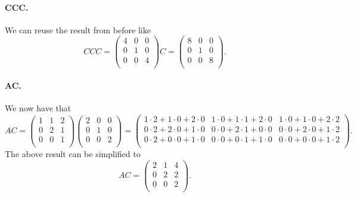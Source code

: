\paragraph{CCC.} We can reuse the result from before like
\[ 
C C C= \begin{pmatrix}
4 & 0 & 0\\
0 & 1 & 0\\
0 & 0 & 4\\
\end{pmatrix} C = \begin{pmatrix}
8 & 0 & 0\\
0 & 1 & 0\\
0 & 0 & 8\\
\end{pmatrix}
.\]

\paragraph{AC.} We now have that
\[ 
AC = \begin{pmatrix}
1 & 1 & 2\\
0 & 2 & 1\\
0 & 0 & 1\\
\end{pmatrix} \begin{pmatrix}
2 & 0 & 0\\
0 & 1 & 0\\
0 & 0 & 2\\
\end{pmatrix} = \begin{pmatrix}
1\cdot 2 + 1 \cdot 0 + 2 \cdot 0 & 1 \cdot 0 + 1 \cdot 1 + 2 \cdot 0 & 1 \cdot 0 + 1 \cdot 0 + 2 \cdot 2\\
0 \cdot 2 + 2 \cdot 0 + 1 \cdot 0 & 0 \cdot 0 + 2 \cdot 1 + 0 \cdot 0 & 0 \cdot 0 + 2 \cdot 0 + 1 \cdot 2\\
0 \cdot 2 + 0 \cdot 0 + 1 \cdot 0 & 0 \cdot 0 + 0 \cdot 1 + 1 \cdot 0 & 0 \cdot 0 + 0 \cdot  0 + 1 \cdot 2 \\
\end{pmatrix}
.\]
The above result can be simplified to
\[ 
AC = \begin{pmatrix}
2 & 1 & 4\\
0 & 2 & 2\\
0 & 0 & 2\\
\end{pmatrix}
.\]


